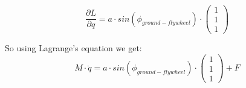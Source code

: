 \begin{equation}
	\frac{\partial L}{\partial q} = a \cdot sin(\phi_{ground-flywheel}) \cdot 	
	\begin{pmatrix}
	1 \\ 1 \\ 1
	\end{pmatrix}	
\end{equation}

So using Lagrange's equation we get:
\begin{equation}
	\boxed{
	M \cdot \ddot{q} = a \cdot sin(\phi_{ground-flywheel}) \cdot 	
	\begin{pmatrix}
	1 \\ 1 \\ 1
	\end{pmatrix} + F
	}
\end{equation}